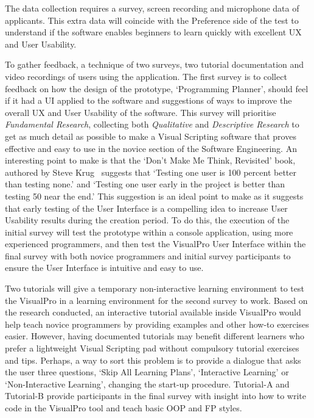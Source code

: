 \documentclass[12pt]{report} %
\begin{document}
	The data collection requires a survey, screen recording and microphone data of applicants. This extra data will coincide with the Preference side of the test to understand if the software enables beginners to learn quickly with excellent UX and User Usability. 

	To gather feedback, a technique of two surveys, two tutorial documentation and video recordings of users using the application. The first survey is to collect feedback on how the design of the prototype, `Programming Planner', should feel if it had a UI applied to the software and suggestions of ways to improve the overall UX and User Usability of the software. This survey will prioritise \textit{Fundamental Research}, collecting both \textit{Qualitative} and \textit{Descriptive Research} to get as much detail as possible to make a Visual Scripting software that proves effective and easy to use in the novice section of the Software Engineering. An interesting point to make is that the `Don't Make Me Think, Revisited' book, authored by Steve Krug~\cite{krug_steve_dont_2014} suggests that `Testing one user is 100 percent better than testing none.' and `Testing one user early in the project is better than testing 50 near the end.' This suggestion is an ideal point to make as it suggests that early testing of the User Interface is a compelling idea to increase User Usability results during the creation period. To do this, the execution of the initial survey will test the prototype within a console application, using more experienced programmers, and then test the VisualPro User Interface within the final survey with both novice programmers and initial survey participants to ensure the User Interface is intuitive and easy to use.

	Two tutorials will give a temporary non-interactive learning environment to test the VisualPro in a learning environment for the second survey to work. Based on the research conducted, an interactive tutorial available inside VisualPro would help teach novice programmers by providing examples and other how-to exercises easier. However, having documented tutorials may benefit different learners who prefer a lightweight Visual Scripting pad without compulsory tutorial exercises and tips. Perhaps, a way to sort this problem is to provide a dialogue that asks the user three questions, `Skip All Learning Plans', `Interactive Learning' or `Non-Interactive Learning', changing the start-up procedure. Tutorial-A and Tutorial-B provide participants in the final survey with insight into how to write code in the VisualPro tool and teach basic OOP and FP styles.
\end{document}

